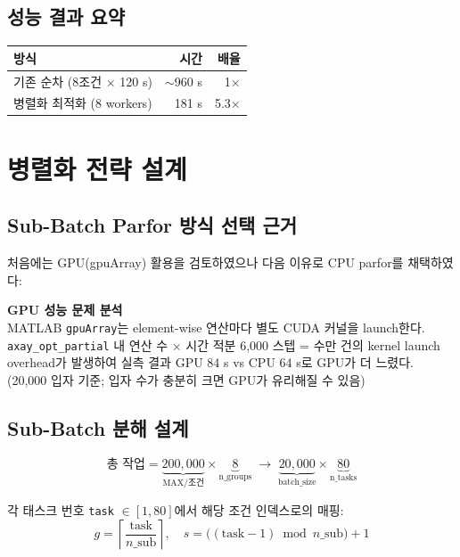 \documentclass[11pt, a4paper]{article}
\begin{document}
\subsection{성능 결과 요약}

\begin{center}
\begin{tabular}{lrr}
\toprule
방식 & 시간 & 배율 \\
\midrule
기존 순차 (8조건 $\times$ 120 s) & $\sim$960 s & 1$\times$ \\
병렬화 최적화 (8 workers) & 181 s & 5.3$\times$ \\
\bottomrule
\end{tabular}
\end{center}

\section{병렬화 전략 설계}

\subsection{Sub-Batch Parfor 방식 선택 근거}

처음에는 GPU(gpuArray) 활용을 검토하였으나 다음 이유로 CPU parfor를 채택하였다:

\begin{mdframed}[backgroundcolor=backcolour, linecolor=black!20]
\textbf{GPU 성능 문제 분석}\\
MATLAB \texttt{gpuArray}는 element-wise 연산마다 별도 CUDA 커널을 launch한다.
\texttt{axay\_opt\_partial} 내 연산 수 $\times$ 시간 적분 6,000 스텝
= 수만 건의 kernel launch overhead가 발생하여 실측 결과 GPU 84 s vs CPU 64 s로
GPU가 더 느렸다. (20,000 입자 기준; 입자 수가 충분히 크면 GPU가 유리해질 수 있음)
\end{mdframed}

\subsection{Sub-Batch 분해 설계}

\[
  \text{총 작업} = \underbrace{200{,}000}_{\text{MAX/조건}} \times \underbrace{8}_{\text{n\_groups}}
  \;\longrightarrow\;
  \underbrace{20{,}000}_{\text{batch\_size}} \times \underbrace{80}_{\text{n\_tasks}}
\]

각 태스크 번호 \texttt{task} $\in [1, 80]$에서 해당 조건 인덱스로의 매핑:
\[
  g = \left\lceil \frac{\text{task}}{n\_\text{sub}} \right\rceil, \quad
  s = \bigl((\text{task}-1) \bmod n\_\text{sub}\bigr) + 1
\]
\end{document}
